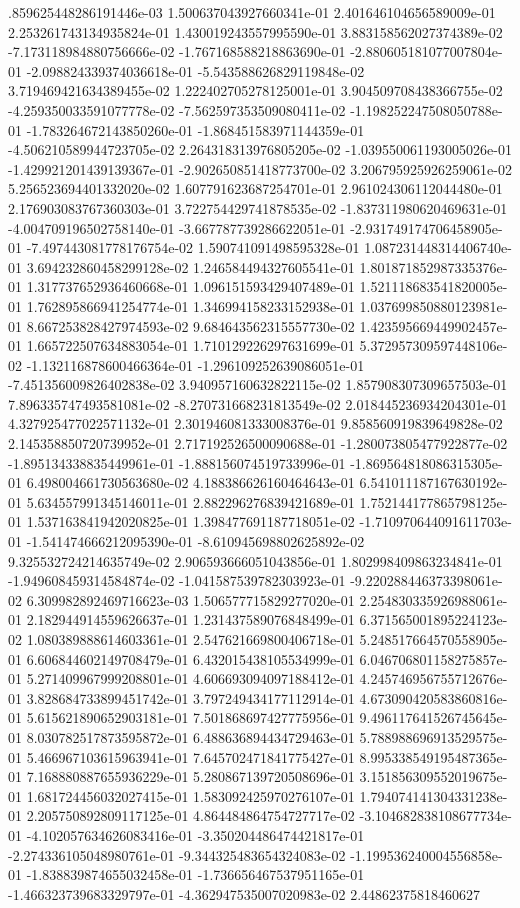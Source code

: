 .859625448286191446e-03	1.500637043927660341e-01	2.401646104656589009e-01	2.253261743134935824e-01	1.430019243557995590e-01	3.883158562027374389e-02	-7.173118984880756666e-02	-1.767168588218863690e-01	-2.880605181077007804e-01	-2.098824339374036618e-01	-5.543588626829119848e-02	3.719469421634389455e-02	1.222402705278125001e-01	3.904509708438366755e-02	-4.259350033591077778e-02	-7.562597353509080411e-02	-1.198252247508050788e-01	-1.783264672143850260e-01	-1.868451583971144359e-01	-4.506210589944723705e-02	2.264318313976805205e-02	-1.039550061193005026e-01	-1.429921201439139367e-01	-2.902650851418773700e-02	3.206795925926259061e-02	5.256523694401332020e-02	1.607791623687254701e-01	2.961024306112044480e-01	2.176903083767360303e-01	3.722754429741878535e-02	-1.837311980620469631e-01	-4.004709196502758140e-01	-3.667787739286622051e-01	-2.931749174706458905e-01	-7.497443081778176754e-02	1.590741091498595328e-01	1.087231448314406740e-01	3.694232860458299128e-02	1.246584494327605541e-01	1.801871852987335376e-01	1.317737652936460668e-01	1.096151593429407489e-01	1.521118683541820005e-01	1.762895866941254774e-01	1.346994158233152938e-01	1.037699850880123981e-01	8.667253828427974593e-02	9.684643562315557730e-02	1.423595669449902457e-01	1.665722507634883054e-01	1.710129226297631699e-01	5.372957309597448106e-02	-1.132116878600466364e-01	-1.296109252639086051e-01	-7.451356009826402838e-02	3.940957160632822115e-02	1.857908307309657503e-01	7.896335747493581081e-02	-8.270731668231813549e-02	2.018445236934204301e-01	4.327925477022571132e-01	2.301946081333008376e-01	9.858560919839649828e-02	2.145358850720739952e-01	2.717192526500090688e-01	-1.280073805477922877e-02	-1.895134338835449961e-01	-1.888156074519733996e-01	-1.869564818086315305e-01	6.498004661730563680e-02	4.188386626160464643e-01	6.541011187167630192e-01	5.634557991345146011e-01	2.882296276839421689e-01	1.752144177865798125e-01	1.537163841942020825e-01	1.398477691187718051e-02	-1.710970644091611703e-01	-1.541474666212095390e-01	-8.610945698802625892e-02	9.325532724214635749e-02	2.906593666051043856e-01	1.802998409863234841e-01	-1.949608459314584874e-02	-1.041587539782303923e-01	-9.220288446373398061e-02	6.309982892469716623e-03	1.506577715829277020e-01	2.254830335926988061e-01	2.182944914559626637e-01	1.231437589076848499e-01	6.371565001895224123e-02	1.080389888614603361e-01	2.547621669800406718e-01	5.248517664570558905e-01	6.606844602149708479e-01	6.432015438105534999e-01	6.046706801158275857e-01	5.271409967999208801e-01	4.606693094097188412e-01	4.245746956755712676e-01	3.828684733899451742e-01	3.797249434177112914e-01	4.673090420583860816e-01	5.615621890652903181e-01	7.501868697427775956e-01	9.496117641526745645e-01	8.030782517873595872e-01	6.488636894434729463e-01	5.788988696913529575e-01	5.466967103615963941e-01	7.645702471841775427e-01	8.995338549195487365e-01	7.168880887655936229e-01	5.280867139720508696e-01	3.151856309552019675e-01	1.681724456032027415e-01	1.583092425970276107e-01	1.794074141304331238e-01	2.205750892809117125e-01	4.864484864754727717e-02	-3.104682838108677734e-01	-4.102057634626083416e-01	-3.350204486474421817e-01	-2.274336105048980761e-01	-9.344325483654324083e-02	-1.199536240004556858e-01	-1.838839874655032458e-01	-1.736656467537951165e-01	-1.466323739683329797e-01	-4.362947535007020983e-02	2.44862375818460627